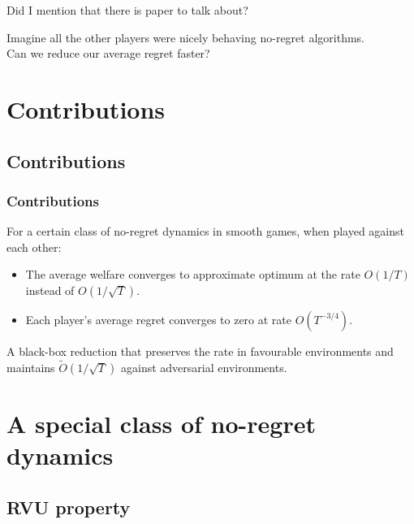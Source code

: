 \documentclass{beamer}
\begin{document}
\begin{frame}[c]
	\begin{center}
		\Huge Did I mention that there is paper to talk about?
	\end{center}
\end{frame}


\begin{frame}[c]
	\begin{center}
		\Huge Imagine all the other players were nicely behaving no-regret algorithms.\\\pause
		Can we reduce our average regret faster?
	\end{center}
\end{frame}

\section{Contributions}
\subsection{Contributions}
\begin{frame}
	\frametitle{Contributions}
	For a certain class of no-regret dynamics in smooth games, when played against each other:
	\begin{itemize}
		\item\alert<3>{ The average welfare converges to approximate optimum at the rate $O(1/T)$ instead of $O(1/\sqrt{T})$.}
		\item Each player's average regret converges to zero at rate $O(T^{-3/4})$.
	\end{itemize}\pause
	A black-box reduction that preserves the rate in favourable environments and maintains $\tilde{O}(1/\sqrt{T})$ against adversarial environments.
\end{frame}




\section[A class of no-regret dynamics]{A special class of no-regret dynamics}
\subsection{RVU property}
\end{document}
